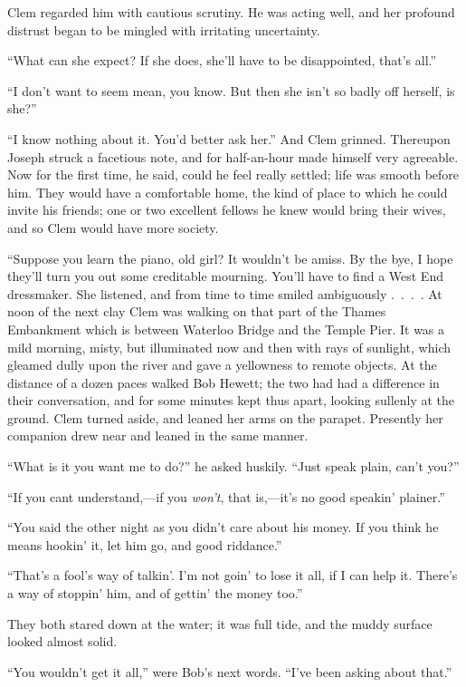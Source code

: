 Clem regarded him with cautious scrutiny. He was acting well, and her
profound distrust began to be mingled with irritating uncertainty.

``What can she expect? If she does, she'll have to be disappointed,
that's all.''

``I don't want to seem mean, you know. But then she isn't so badly off
herself, is she?''

``I know nothing about it. You'd better ask her.'' And Clem grinned.
Thereupon Joseph struck a facetious note, and for half-an-hour made
himself very agreeable. Now for the first time, he said, could he feel
really settled; life was smooth before him. They would have a
comfortable home, the kind of place to which he could invite his
friends; one or two excellent fellows he knew would bring their wives,
and so Clem would have more society.

``Suppose you learn the piano, old girl? It wouldn't be amiss. By the
bye, I hope they'll turn you out some creditable mourning. You'll have
to find a West End dressmaker. She listened, and from time to time
smiled {ambiguously {.~.~.~.}} {}At noon of the next clay Clem was
walking on that part of the Thames Embankment which is between Waterloo
Bridge and the Temple Pier. It was a mild morning, misty, but
illuminated now and then with rays of sunlight, which gleamed dully upon
the river and gave a yellowness to remote objects. At the distance of a
dozen paces walked Bob Hewett; the two had had a difference in their
conversation, and for some minutes kept thus apart, looking sullenly at
the ground. Clem turned aside, and leaned her arms on the parapet.
Presently her companion drew near and leaned in the same manner.

``What is it you want me to do?'' he asked huskily. ``Just speak plain,
can't you?''

``If you cant understand,---if you \emph{won't}, that is,---it's no good
speakin' plainer.''

``You said the other night as you didn't care about his money. If you
think he means hookin' it, let him go, and good riddance.''

``That's a fool's way of talkin'. I'm not goin' to lose it all, if I can
help it. There's a way of stoppin' him, and of gettin' the money too.''

They both stared down at the water; it {}was full tide, and the muddy
surface looked almost solid.

``You wouldn't get it all,'' were Bob's next words. ``I've been asking
about that.''

